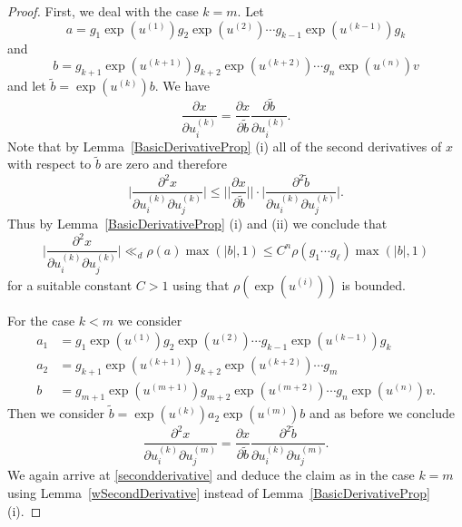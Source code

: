 \documentclass[10pt, english,oneside,reqno]{amsart}
\theoremstyle{plain}
\theoremstyle{remark}
\numberwithin{equation}{section}
\numberwithin{figure}{section}
\begin{document}
\begin{proof}
    First, we deal with the case $k = m$. Let $$a = g_1 \exp(u^{(1)})g_2\exp(u^{(2)}) \cdots g_{k-1} \exp(u^{(k-1)})g_k$$ and $$b = g_{k + 1} \exp(u^{(k+1)})g_{k + 2}\exp(u^{(k + 2)}) \cdots g_{n} \exp(u^{(n)})v$$ and let $\tilde{b} = \exp(u^{(k)})b$. We have $$\frac{\partial x}{\partial u_i^{(k)}} = \frac{\partial x}{\partial \tilde{b}}  \frac{\partial \tilde{b}}{\partial u_i^{(k)}}.$$ Note that by Lemma~\ref{BasicDerivativeProp} (i) all of the second derivatives of $x$ with respect to $\tilde{b}$ are zero and therefore
    \begin{equation}\label{secondderivative}
        \bigg|\frac{\partial^2 x}{\partial u_i^{(k)}\partial u_j^{(k)}}\bigg|  \leq \bigg| \bigg| \frac{\partial x}{\partial \tilde{b}}\bigg|\bigg| \cdot \bigg| \frac{\partial^2 \tilde{b}}  {\partial u_i^{(k)}\partial u_j^{(k)}}\bigg| .
    \end{equation}
    Thus by Lemma~\ref{BasicDerivativeProp} (i) and (ii) we conclude that $$\bigg|\frac{\partial^2 x}{\partial u_i^{(k)}\partial u_j^{(k)}}\bigg| \ll_d \rho(a)\max(|b|,1) \leq C^n\rho(g_1\cdots g_{\ell})\max(|b|,1)$$ for a suitable constant $C > 1$ using that $\rho(\exp(u^{(i)}))$ is bounded. 

    For the case $k < m$ we consider  
    \begin{align*}
        a_1 &= g_1 \exp(u^{(1)})g_2\exp(u^{(2)}) \cdots g_{k-1} \exp(u^{(k-1)})g_k \\
        a_2 &= g_{k + 1} \exp(u^{(k+1)})g_{k + 2}\exp(u^{(k + 2)}) \cdots g_{m}  \\
        b &= g_{m + 1} \exp(u^{(m+1)})g_{m + 2}\exp(u^{(m + 2)}) \cdots g_{n} \exp(u^{(n)})v.
    \end{align*} Then we consider $\tilde{b} = \exp(u^{(k)})a_2\exp(u^{(m)})b$ and as before we conclude $$\frac{\partial^2 x}{\partial u_i^{(k)}\partial u_j^{(m)}} = \frac{\partial x}{\partial \tilde{b}}\frac{\partial^2 \tilde{b}}{\partial u_i^{(k)}\partial u_j^{(m)}}.$$ We again arrive at \eqref{secondderivative} and deduce the claim as in the case $k = m$ using Lemma~\ref{wSecondDerivative} instead of Lemma~\ref{BasicDerivativeProp} (i).
\end{proof}
\end{document}
